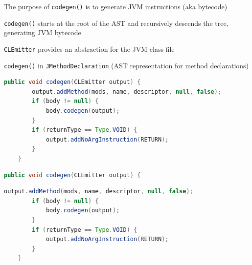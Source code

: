 \documentclass[8pt,a4paper,compress]{beamer}
\begin{document}
\begin{frame}[fragile]
\pause

The purpose of \lstinline{codegen()} is to generate JVM instructions (aka bytecode)

\pause\bigskip

\lstinline{codegen()} starts at the root of the AST and recursively descends the tree, generating JVM bytecode

\pause\bigskip

\lstinline{CLEmitter} provides an abstraction for the JVM class file

\pause\bigskip

\lstinline{codegen()} in \lstinline{JMethodDeclaration} (AST representation for method declarations)

\begin{overprint}
\begin{tcolorbox}[enhanced,drop shadow southwest,sharp corners,size=fbox,colback=white,fontlower=\small\ttfamily,collower=silver100]

\begin{lstlisting}[language=Java,style=focusin]
    public void codegen(CLEmitter output) {
        output.addMethod(mods, name, descriptor, null, false);
        if (body != null) {
            body.codegen(output);
        }
        if (returnType == Type.VOID) {
            output.addNoArgInstruction(RETURN);
        }
    }
\end{lstlisting}

\tcblower
\begin{minipage}[t][.25cm][t]{\textwidth}

\end{minipage}
\end{tcolorbox}

\begin{tcolorbox}[enhanced,drop shadow southwest,sharp corners,size=fbox,colback=white,fontlower=\small\ttfamily,collower=silver900]

\begin{lstlisting}[language=Java,style=focusin,backgroundcolor=\color{lime100}]
    public void codegen(CLEmitter output) {
\end{lstlisting}
\begin{lstlisting}[language=Java,style=focusout]
        output.addMethod(mods, name, descriptor, null, false);
        if (body != null) {
            body.codegen(output);
        }
        if (returnType == Type.VOID) {
            output.addNoArgInstruction(RETURN);
        }
    }
\end{lstlisting}


\end{tcolorbox}
\end{overprint}
\end{frame}
\end{document}
